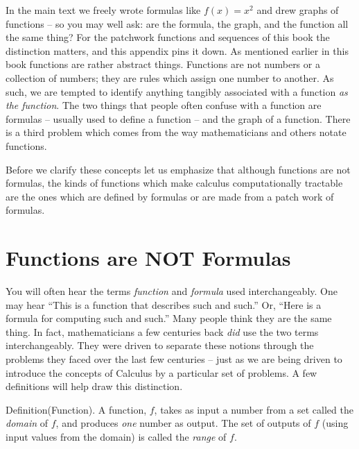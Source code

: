 %
%


In the main text we freely wrote formulas like $f(x) = x^2$ and drew
graphs of functions -- so you may well ask: are the formula, the graph,
and the function all the same thing? For the patchwork functions and
sequences of this book the distinction matters, and this appendix pins
it down. As
mentioned earlier in this book functions are rather abstract things. Functions
are not numbers or a collection of numbers; they are rules which assign one 
number to another. As such, we are tempted to identify anything tangibly 
associated with a function {\it as the function\/}. The two things that 
people often confuse with a function are formulas 
-- usually used to define a function -- and the graph of a function. 
There is a third problem which comes from the way mathematicians and others 
notate functions. 

Before we clarify these concepts let us emphasize that 
although functions are not formulas, the kinds of functions which make 
calculus computationally tractable are the ones 
which are defined by formulas or are made from a patch work of formulas.

\section{Functions are NOT Formulas}
You will often hear the terms {\it function\/} and {\it formula\/} used 
interchangeably. One may hear 
``This is a function that describes such and such.'' Or, 
``Here is a formula for computing such and such.'' Many people think 
they are the same thing. In fact, mathematicians a few centuries back 
{\it did\/} use 
the two terms interchangeably. They were driven to separate these notions 
through the problems they faced over the last few centuries --
just as we are being driven to introduce the concepts of Calculus by a 
particular set of problems. A few definitions will help draw this distinction.

\proclaim Definition(Function). A function, $f$, takes as input a number
from a set called the {\it domain\/} of $f$, and produces
{\it one\/} number as output. The set of outputs of $f$ (using input values from the domain) is called the 
{\it range\/} of $f$.

